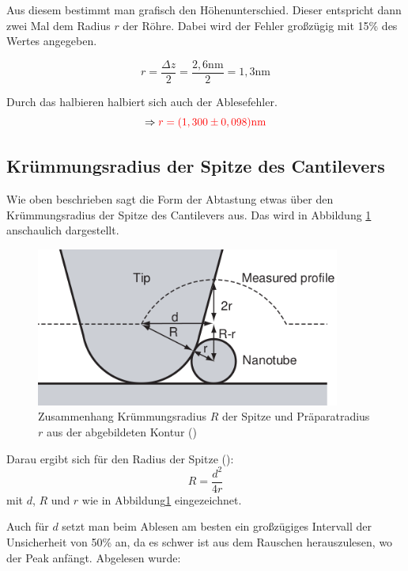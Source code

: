 Aus diesem bestimmt man grafisch den Höhenunterschied. Dieser entspricht dann zwei Mal dem Radius $r$ der Röhre. Dabei wird der Fehler 
großzügig mit 15\% des Wertes angegeben.

\begin{equation*}
   r = \frac{\Delta z}{2} = \frac{2,6\mathrm{nm}}{2} = 1,3\mathrm{nm}
\end{equation*}

Durch das halbieren halbiert sich auch der Ablesefehler. 
\begin{equation*}
    \Rightarrow \textcolor{red}{r = (1,300 \pm 0,098)\mathrm{nm}}
\end{equation*}


\subsection{Krümmungsradius der Spitze des Cantilevers}

Wie oben beschrieben sagt die Form der Abtastung etwas über den Krümmungsradius der Spitze des Cantilevers aus. Das wird in Abbildung 
\ref{NanoTip} anschaulich dargestellt.

\begin{figure}
    \centering
    \includegraphics[width = 10cm]{Bilder/Nanotubes/TipGeoNano.png}
    \caption{Zusammenhang Krümmungsradius $R$ der Spitze und Präparatradius $r$ aus der abgebildeten Kontur (\cite[S.46]{SampleKit2007})}
    \label{NanoTip}
\end{figure}

Darau ergibt sich für den Radius der Spitze (\cite[S.47]{SampleKit2007}):\\
\begin{equation}
    R = \frac{d^2}{4r}
\end{equation}
mit $d$, $R$ und $r$ wie in Abbildung\ref{NanoTip} eingezeichnet.

Auch für $d$ setzt man beim Ablesen am besten ein großzügiges Intervall der Unsicherheit von 50\% an, da es schwer ist aus 
dem Rauschen herauszulesen, wo der Peak anfängt. Abgelesen wurde:\\

